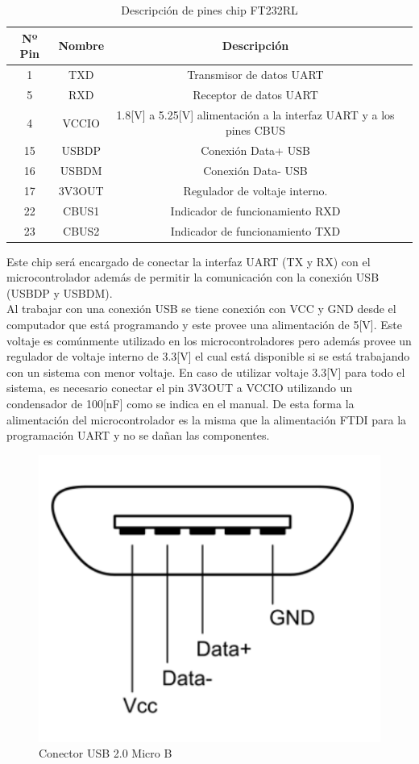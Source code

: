 \begin{table}[H]
\centering
\begin{tabular}{| c | c | c | c |}
\hline
\multicolumn{1}{|c|}{\textbf{Nº Pin}}&
\multicolumn{1}{c|}{\textbf{Nombre}}&
\multicolumn{1}{|c|}{\textbf{Descripción}}\\ \hline
1  & TXD    & Transmisor de datos UART \\ \hline
5  & RXD    & Receptor de datos UART    \\ \hline
4  & VCCIO  & 1.8[V] a 5.25[V] alimentación a la interfaz UART y a los pines CBUS \\ \hline
15 & USBDP  & Conexión Data+ USB \\ \hline
16 & USBDM  & Conexión Data- USB \\ \hline
17 & 3V3OUT & Regulador de voltaje interno.    \\ \hline
22 & CBUS1  & Indicador de funcionamiento RXD   \\ \hline
23 & CBUS2  & Indicador de funcionamiento TXD    \\ \hline
\end{tabular}
\caption{Descripción de pines chip FT232RL}
\label{ft232}
\end{table}

Este chip será encargado de conectar la interfaz UART (TX y RX) con el microcontrolador además de permitir la comunicación con la conexión USB (USBDP y USBDM).\\
Al trabajar con una conexión USB se tiene conexión con VCC y GND desde el computador que está programando y este provee una alimentación de 5[V]. Este voltaje es comúnmente utilizado en los microcontroladores pero además provee un regulador de voltaje interno de 3.3[V] el cual está disponible si se está trabajando con un sistema con menor voltaje.
En caso de utilizar voltaje 3.3[V] para todo el sistema, es necesario conectar el pin 3V3OUT a VCCIO utilizando un condensador de 100[nF] como se indica en el manual. De esta forma la alimentación del microcontrolador es la misma que la alimentación FTDI para la programación UART y no se dañan las componentes.

\begin{figure}[H]
\centering
\includegraphics[scale=0.6]{figuras/firmware/usb.png}
\caption{Conector USB 2.0 Micro B}
\label{usb}
\end{figure}

